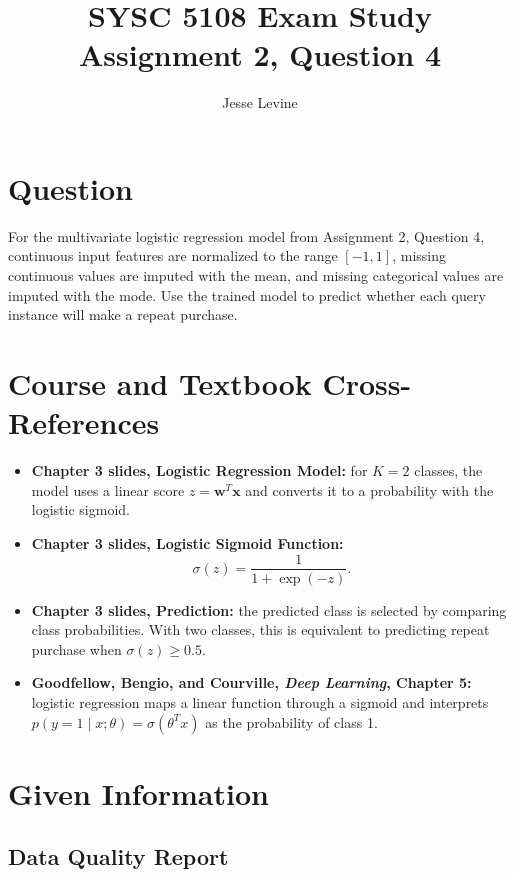 \documentclass[11pt]{article}
\title{SYSC 5108 Exam Study\\Assignment 2, Question 4}
\author{Jesse Levine}
\date{}
\begin{document}
\maketitle

\section*{Question}

For the multivariate logistic regression model from Assignment 2, Question 4,
continuous input features are normalized to the range \([-1,1]\), missing
continuous values are imputed with the mean, and missing categorical values are
imputed with the mode. Use the trained model to predict whether each query
instance will make a repeat purchase.

\section*{Course and Textbook Cross-References}

\begin{itemize}
    \item \textbf{Chapter 3 slides, Logistic Regression Model:} for \(K=2\)
    classes, the model uses a linear score \(z=\mathbf{w}^{T}\mathbf{x}\) and
    converts it to a probability with the logistic sigmoid.
    \item \textbf{Chapter 3 slides, Logistic Sigmoid Function:}
    \[
        \sigma(z)=\frac{1}{1+\exp(-z)}.
    \]
    \item \textbf{Chapter 3 slides, Prediction:} the predicted class is selected
    by comparing class probabilities. With two classes, this is equivalent to
    predicting repeat purchase when \(\sigma(z)\ge 0.5\).
    \item \textbf{Goodfellow, Bengio, and Courville, \emph{Deep Learning},
    Chapter 5:} logistic regression maps a linear function through a sigmoid and
    interprets \(p(y=1\mid x;\theta)=\sigma(\theta^T x)\) as the probability of
    class 1.
\end{itemize}

\section*{Given Information}

\subsection*{Data Quality Report}
\end{document}

